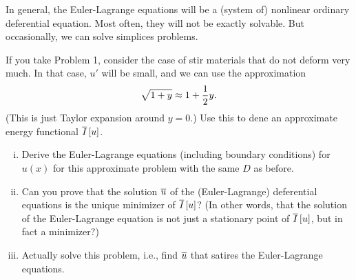 \documentclass[12pt]{memoir}
\begin{document}
\begin{Ej}
    In general, the Euler-Lagrange equations will be a (system
    of) nonlinear ordinary deferential equation. Most often, they will not be exactly solvable. But occasionally,
    we can solve simplices problems.\par
    If you take Problem 1, consider the case of stir materials that do not deform very much. In that case, $u'$
    will be small, and we can use the approximation
    $$\sqrt{1+y}\approx 1+\half y.$$
    (This is just Taylor expansion around $y = 0$.) Use this to dene an approximate energy functional $\overline I\left\lbrack u\right\rbrack$.
    \begin{enumerate}[i)]
        \item Derive the Euler-Lagrange equations (including boundary conditions) for $u(x)$ for this approximate
        problem with the same $D$ as before.
        \item Can you prove that the solution $\overline u$ of the (Euler-Lagrange) deferential equations is the unique minimizer
        of $\overline I\left\lbrack u\right\rbrack$? (In other words, that the solution of the Euler-Lagrange equation is not just a stationary
        point of $\overline I\left\lbrack u\right\rbrack$, but in fact a minimizer?)
        \item Actually solve this problem, i.e., find $\overline u$ that satires the Euler-Lagrange equations.
    \end{enumerate}
\end{Ej}
\end{document}
